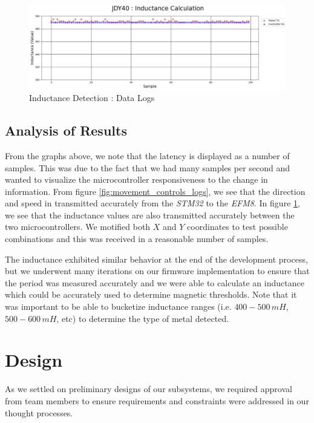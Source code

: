 \documentclass{article}
\begin{document}
\begin{figure}[htbp]
    \centering
    \includegraphics[width=1\textwidth]{Figures/Inductance_Logs.jpg}
    \caption{Inductance Detection : Data Logs}
    \label{fig:inductance_detection_logs}
\end{figure}

\subsection{Analysis of Results}

From the graphs above, we note that the latency is displayed as a number of samples. This was due to the fact that we had
many samples per second and wanted to visualize the microcontroller responsiveness to the change in information. From figure \ref{fig:movement_controls_logs}, we
see that the direction and speed in transmitted accurately from the \textit{STM32} to the \textit{EFM8}. In figure \ref{fig:inductance_detection_logs}, we see that the inductance values
are also transmitted accurately between the two microcontrollers. We motified both $X$ and $Y$ coordinates to test possible combinations and this was received in a reasonable number of samples.

The inductance exhibited similar behavior at the end of the development process, but we underwent many iterations on our firmware implementation to ensure that the period was
measured accurately and we were able to calculate an inductance which could be accurately used to determine magnetic thresholds. Note that it was important to be able to
bucketize inductance ranges (i.e. $400-500\, mH$, $500-600\, mH$, etc) to determine the type of metal detected.

\section{Design}

As we settled on preliminary designs of our subsystems, we required approval from team members to ensure requirements and constraints were addressed in our thought processes.
\end{document}
